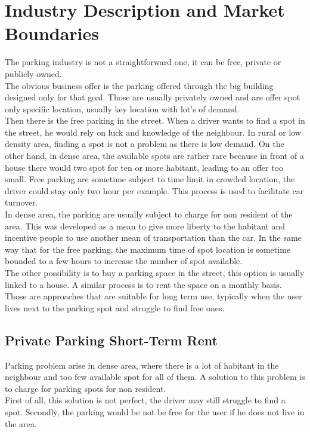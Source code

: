 \documentclass[12pt,a4paper,oneside]{book}
\begin{document}
\section{Industry Description and Market Boundaries}
The parking industry is not a straightforward one, it can be free, private or publicly owned.\\
The obvious business offer is the parking offered through the big building designed only for that goal. Those are usually privately owned and are offer spot only specific location, usually key location with lot's of demand.\\
Then there is the free parking in the street. When a driver wants to find a spot in the street, he would rely on luck and knowledge of the neighbour. In rural or low density area, finding a spot is not a problem as there is low demand. On the other hand, in dense area, the available spots are rather rare because in front of a house there would two spot for ten or more habitant, leading to an offer too small. Free parking are sometime subject to time limit in crowded location, the driver could stay only two hour per example. This process is used to facilitate car turnover.\\
In dense area, the parking are usually subject to charge for non resident of the area. This was developed as a mean to give more liberty to the habitant and incentive people to use another mean of transportation than the car.\cite{nycar} In the same way that for the free parking, the maximum time of spot location is sometime bounded to a few hours to increase the number of spot available.\cite{bxpay} \\
The other possibility is to buy a parking space in the street, this option is usually linked to a house. A similar process is to rent the space on a monthly basis. Those are approaches that are suitable for long term use, typically when the user lives next to the parking spot and struggle to find free ones.

\subsection{Private Parking Short-Term Rent}
Parking problem arise in dense area, where there is a lot of habitant in the neighbour and too few available spot for all of them. A solution to this problem is to charge for parking spots for non resident.\\
First of all, this solution is not perfect, the driver may still struggle to find a spot. Secondly, the parking would be not be free for the user if he does not live in the area.\\
\end{document}
